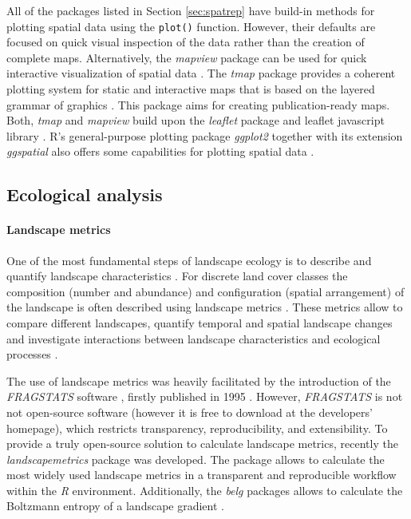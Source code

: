 \documentclass[smallextended]{svjour3}       %
\begin{document}
All of the packages listed in Section \ref{sec:spatrep} have build-in methods for plotting spatial data using the \texttt{plot()} function.
However, their defaults are focused on quick visual inspection of the data rather than the creation of complete maps.
Alternatively, the \emph{mapview} package can be used for quick interactive visualization of spatial data \cite{R-mapview}.
The \emph{tmap} package provides a coherent plotting system for static and interactive maps that is based on the layered grammar of graphics \cite{Tennekes2018}.
This package aims for creating publication-ready maps.
Both, \emph{tmap} and \emph{mapview} build upon the \emph{leaflet} package and leaflet javascript library \cite{R-leaflet}.
R's general-purpose plotting package \emph{ggplot2} together with its extension \emph{ggspatial} also offers some capabilities for plotting spatial data \cite{Wickham2016a,R-ggspatial}.

\hypertarget{sec:ecological_analysis}{%
\subsection{Ecological analysis}\label{sec:ecological_analysis}}

\hypertarget{sec:landscape_metrics}{%
\paragraph{Landscape metrics}\label{sec:landscape_metrics}}

One of the most fundamental steps of landscape ecology is to describe and quantify landscape characteristics \cite{Turner2005,Lausch2015}.
For discrete land cover classes the composition (number and abundance) and configuration (spatial arrangement) of the landscape is often described using landscape metrics \cite{Gustafson1998,Uuemaa2009,Uuemaa2013,Gustafson2019}.
These metrics allow to compare different landscapes, quantify temporal and spatial landscape changes and investigate interactions between landscape characteristics and ecological processes \cite{Uuemaa2009}.

The use of landscape metrics was heavily facilitated by the introduction of the \emph{FRAGSTATS} software \cite{McGarigal2012}, firstly published in 1995 \cite{Kupfer2012,Gustafson2019}.
However, \emph{FRAGSTATS} is not not open-source software (however it is free to download at the developers' homepage), which restricts transparency, reproducibility, and extensibility.
To provide a truly open-source solution to calculate landscape metrics, recently the \emph{landscapemetrics} package \cite{Hesselbarth2019a} was developed.
The package allows to calculate the most widely used landscape metrics in a transparent and reproducible workflow within the \emph{R} environment.
Additionally, the \emph{belg} packages allows to calculate the Boltzmann entropy of a landscape gradient \cite{Nowosad2019a}.
\end{document}
